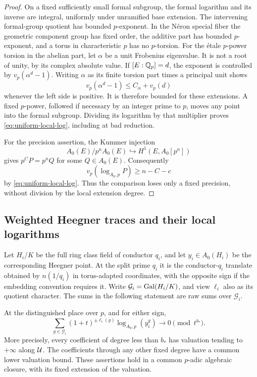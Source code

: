 \begin{proof}
On a fixed sufficiently small formal subgroup, the formal logarithm
and its inverse are integral, uniformly under unramified base
extension.  The intervening formal-group quotient has bounded
$p$-exponent.  In the N\'eron special fiber the geometric component
group has fixed order, the additive part has bounded $p$-exponent,
and a torus in characteristic $p$ has no $p$-torsion.  For the
\'etale $p$-power torsion in the abelian part, let $\alpha$ be a
unit Frobenius eigenvalue.  It is not a root of unity, by its
complex absolute value.  If $[E:\mathbb Q_p]=d$, the exponent is
controlled by $v_p(\alpha^d-1)$.  Writing $\alpha$ as its finite
torsion part times a principal unit shows
\[
 v_p(\alpha^d-1)\le C_\alpha+v_p(d)
\]
whenever the left side is positive.  It is therefore bounded for
these extensions.  A fixed $p$-power, followed if necessary by an
integer prime to $p$, moves any point into the formal subgroup.
Dividing its logarithm by that multiplier proves
\cref{eq:uniform-local-log}, including at bad reduction.

For the precision assertion, the Kummer injection
\[
 A_0(E)/p^n A_0(E)\hookrightarrow H^1(E,A_0[p^n])
\]
gives $p^C P=p^n Q$ for some $Q\in A_0(E)$.  Consequently
\[
 v_p(\log_{A_0,p}P)\ge n-C-c
\]
by \cref{eq:uniform-local-log}.  Thus the comparison loses only
a fixed precision, without division by the local extension degree.
\end{proof}

\subsection{Weighted Heegner traces and their local logarithms}

Let $H_i/K$ be the full ring class field of conductor $q_i$, and
let $y_i\in A_0(H_i)$ be the corresponding Heegner point.  At the
split prime $q_i$ it is the conductor-$q_i$ translate obtained by
$n(1/q_i)$ in torus-adapted coordinates, with the opposite sign
if the embedding convention requires it.  Write
$\mathcal G_i=\operatorname{Gal}(H_i/K)$, and view $\ell_i$ also as its quotient
character.  The sums in the following statement are raw sums
over $\mathcal G_i$.

\begin{proposition}\label{prop:heegner-log}
At the distinguished place over $p$, and for either sign,
\begin{equation}\label{eq:heegner-log}
 \sum_{g\in\mathcal G_i}(1+t)^{\pm\ell_i(g)}
       \log_{A_0,p}(y_i^g)
       \longrightarrow0\pmod {t^{b_*}}.
\end{equation}
More precisely, every coefficient of degree less than $b_*$ has
valuation tending to $+\infty$ along $\mathcal U$.  The coefficients
through any other fixed degree have a common lower valuation
bound.  These assertions hold in a common $p$-adic algebraic
closure, with its fixed extension of the valuation.
\end{proposition}

